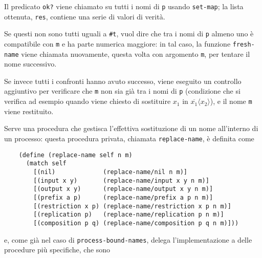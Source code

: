 Il predicato \lstinline{ok?} viene chiamato su tutti i nomi di \lstinline{p}
usando \lstinline{set-map}; la lista ottenuta, \lstinline{res}, contiene
una serie di valori di verit\`a.

Se questi non sono tutti uguali a \lstinline{#t}, vuol dire che tra i nomi
di \lstinline{p} almeno uno \`e compatibile con \lstinline{m} e ha parte
numerica maggiore: in tal caso, la funzione \lstinline{fresh-name} viene
chiamata nuovamente, questa volta con argomento \lstinline{m}, per tentare
il nome successivo.

Se invece tutti i confronti hanno avuto successo, viene eseguito un
controllo aggiuntivo per verificare che \lstinline{m} non sia gi\`a tra
i nomi di \lstinline{p} (condizione che si verifica ad esempio quando viene
chiesto di sostituire $x_1$ in $\overline{x_1}\langle x_2\rangle$), e il
nome \lstinline{m} viene restituito.

Serve una procedura che gestisca l'effettiva sostituzione di un nome
all'interno di un processo: questa procedura privata, chiamata
\lstinline{replace-name}, \`e definita come

\begin{lstlisting}
    (define (replace-name self n m)
      (match self
        [(nil)             (replace-name/nil n m)]
        [(input x y)       (replace-name/input x y n m)]
        [(output x y)      (replace-name/output x y n m)]
        [(prefix a p)      (replace-name/prefix a p n m)]
        [(restriction x p) (replace-name/restriction x p n m)]
        [(replication p)   (replace-name/replication p n m)]
        [(composition p q) (replace-name/composition p q n m)]))
\end{lstlisting}

e, come gi\`a nel caso di \lstinline{process-bound-names}, delega
l'implementazione a delle procedure pi\`u specifiche, che sono

